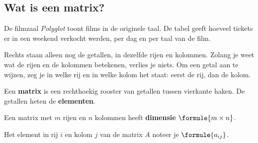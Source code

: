 \subsection{Wat is een matrix?}

De filmzaal \textit{Polyglot} toont films in de originele taal. De tabel geeft hoeveel tickets er in een weekend verkocht werden, per dag en per taal van de film.


Rechts staan alleen nog de getallen, in dezelfde rijen en kolommen. Zolang je weet wat de rijen en de kolommen betekenen, verlies je niets. Om een getal aan te wijzen, zeg je in welke rij en in welke kolom het staat: eerst de rij, dan de kolom.

\begin{theorie}
\begin{minipage}[t]{.56\linewidth}
\vspace{0pt}
Een \textbf{\textcolor{accent}{matrix}} is een rechthoekig rooster van getallen tussen vierkante haken. De getallen heten de \textbf{\textcolor{accent}{elementen}}.

Een matrix met $m$ rijen en $n$ kolommen heeft \textbf{\textcolor{accent}{dimensie}} $\formule{m \times n}$.

Het element in rij $i$ en kolom $j$ van de matrix $A$ noteer je $\formule{a_{ij}}$.
\end{minipage}\hfill
\begin{minipage}[t]{.4\linewidth}
\vspace{0pt}
\end{minipage}
\end{theorie}


